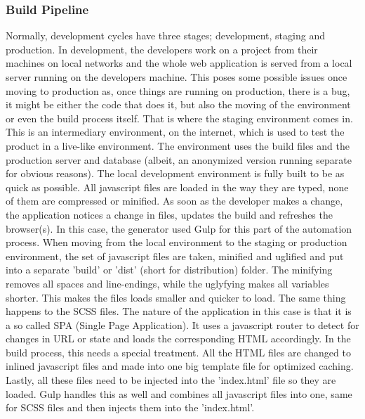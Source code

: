 \subsubsection{Build Pipeline}
Normally, development cycles have three stages; development, staging and production. In development, the developers work on a project from their machines on local networks and the whole web application is served from a local server running on the developers machine. This poses some possible issues once moving to production as, once things are running on production, there is a bug, it might be either the code that does it, but also the moving of the environment or even the build process itself. That is where the staging environment comes in. This is an intermediary environment, on the internet, which is used to test the product in a live-like environment. The environment uses the build files and the production server and database (albeit, an anonymized version running separate for obvious reasons).
\newline
The local development environment is fully built to be as quick as possible. All javascript files are loaded in the way they are typed, none of them are compressed or minified. As soon as the developer makes a change, the application notices a change in files, updates the build and refreshes the browser(s). In this case, the generator used Gulp for this part of the automation process.
\newline
When moving from the local environment to the staging or production environment, the set of javascript files are taken, minified and uglified and put into a separate 'build' or 'dist' (short for distribution) folder. The minifying removes all spaces and line-endings, while the uglyfying makes all variables shorter. This makes the files loads smaller and quicker to load. The same thing happens to the SCSS files.\newline
The nature of the application in this case is that it is a so called SPA (Single Page Application). It uses a javascript router to detect for changes in URL or state and loads the corresponding HTML accordingly. In the build process, this needs a special treatment. All the HTML files are changed to inlined javascript files and made into one big template file for optimized caching.\newline
Lastly, all these files need to be injected into the 'index.html' file so they are loaded. Gulp handles this as well and combines all javascript files into one, same for SCSS files and then injects them into the 'index.html'.\newline
